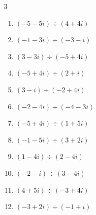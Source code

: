 \begin{multicols}{3}
\begin{enumerate}
  \item $\displaystyle (-5-5i)\div(4+4i)$


  \item $\displaystyle (-1-3i)\div(-3-i)$


\columnbreak %

\resetques

  \item $\displaystyle (3-3i)\div(-5+4i)$


  \item $\displaystyle (-5+4i)\div(2+i)$


  \item $\displaystyle (3-i)\div(-2+4i)$


  \item $\displaystyle (-2-4i)\div(-4-3i)$


  \item $\displaystyle (-5+4i)\div(1+5i)$


  \item $\displaystyle (-1-5i)\div(3+2i)$

        \phantom{$\displaystyle =-1-i$}

  \item $\displaystyle (1-4i)\div(2-4i)$


  \item $\displaystyle (-2-i)\div(3-4i)$


  \item $\displaystyle (4+5i)\div(-3+4i)$


  \item $\displaystyle (-3+2i)\div(-1+i)$


\end{enumerate}
\end{multicols}
